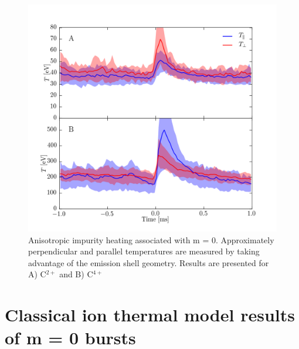 \begin{figure}
	\centering
	\includegraphics[width = 1.\linewidth]{./m0_and_impurity_heating/m0_anisotropy.png}
	\caption[Anisotropic impurity heating associated with m = 0.]{Anisotropic impurity heating associated with m = 0. Approximately perpendicular and parallel temperatures are measured by taking advantage of the emission shell geometry. Results are presented for A) C$^{2+}$ and B)  C$^{4+}$}\label{fig:m0_anisotropy}
\end{figure}

\section{Classical ion thermal model results of m = 0 bursts}

